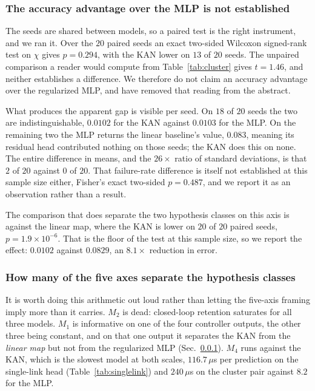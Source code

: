 \subsubsection{The accuracy advantage over the MLP is not established}
\label{sec:results:test}
The seeds are shared between models, so a paired test is the right instrument, and we ran
it. Over the $20$ paired seeds an exact two-sided Wilcoxon signed-rank test on $\chi$ gives
$p=0.294$, with the KAN lower on $13$ of $20$ seeds. The unpaired comparison a reader would
compute from Table~\ref{tab:cluster} gives $t=1.46$, and neither establishes a difference.
We therefore do not claim an accuracy advantage over the regularized MLP, and have removed
that reading from the abstract.

What produces the apparent gap is visible per seed. On $18$ of $20$ seeds the two are
indistinguishable, $0.0102$ for the KAN against $0.0103$ for the MLP. On the remaining two
the MLP returns the linear baseline's value, $0.083$, meaning its residual head contributed
nothing on those seeds; the KAN does this on none. The entire difference in means, and the
$26\times$ ratio of standard deviations, is that $2$ of $20$ against $0$ of $20$. That
failure-rate difference is itself not established at this sample size either, Fisher's exact
two-sided $p=0.487$, and we report it as an observation rather than a result.

The comparison that does separate the two hypothesis classes on this axis is against the
linear map, where the KAN is lower on $20$ of $20$ paired seeds, $p=1.9\times10^{-6}$. That
is the floor of the test at this sample size, so we report the effect: $0.0102$ against
$0.0829$, an $8.1\times$ reduction in error.

\subsubsection{How many of the five axes separate the hypothesis classes}
\label{sec:results:axes}
It is worth doing this arithmetic out loud rather than letting the five-axis framing imply
more than it carries. $M_2$ is dead: closed-loop retention saturates for all three models.
$M_1$ is informative on one of the four controller outputs, the other three being constant,
and on that one output it separates the KAN from the \emph{linear map} but not from the
regularized MLP (Sec.~\ref{sec:results:test}). $M_4$ runs against the KAN, which is the
slowest model at both scales, $116.7\,\mu$s per prediction on the single-link head
(Table~\ref{tab:singlelink}) and $240\,\mu$s on the cluster pair against $8.2$ for the MLP.

